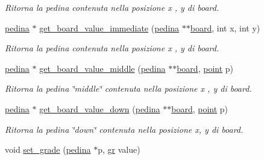 \begin{DoxyCompactItemize}
\begin{DoxyCompactList}\small\item\em Ritorna la {\itshape pedina} contenuta nella posizione {\itshape x} , {\itshape y} di {\itshape board}. \end{DoxyCompactList}\item 
\hyperlink{ml__lib_8h_a71fee95122b31f5cb0b07d9c16ffa3a5}{pedina} $\ast$ \hyperlink{group__Ausiliarie_ga7abcaeb9a9964698ffa11f5f86805909}{get\+\_\+board\+\_\+value\+\_\+immediate} (\hyperlink{ml__lib_8h_a71fee95122b31f5cb0b07d9c16ffa3a5}{pedina} $\ast$$\ast$\hyperlink{ml__main_8c_a62a3fe3d1df9ff58883b669f7f24e516}{board}, int x, int y)
\begin{DoxyCompactList}\small\item\em Ritorna la {\itshape pedina} contenuta nella posizione {\itshape x} , {\itshape y} di {\itshape board}. \end{DoxyCompactList}\item 
\hyperlink{ml__lib_8h_a71fee95122b31f5cb0b07d9c16ffa3a5}{pedina} $\ast$ \hyperlink{group__Ausiliarie_ga1e5f458cec21fb109ef5cff56b57f389}{get\+\_\+board\+\_\+value\+\_\+middle} (\hyperlink{ml__lib_8h_a71fee95122b31f5cb0b07d9c16ffa3a5}{pedina} $\ast$$\ast$\hyperlink{ml__main_8c_a62a3fe3d1df9ff58883b669f7f24e516}{board}, \hyperlink{structpunto}{point} p)
\begin{DoxyCompactList}\small\item\em Ritorna la {\itshape pedina} \char`\"{}middle\char`\"{} contenuta nella posizione {\itshape x} , {\itshape y} di {\itshape board}. \end{DoxyCompactList}\item 
\hyperlink{ml__lib_8h_a71fee95122b31f5cb0b07d9c16ffa3a5}{pedina} $\ast$ \hyperlink{group__Ausiliarie_gacde6d4e847576a401af96d1d84733533}{get\+\_\+board\+\_\+value\+\_\+down} (\hyperlink{ml__lib_8h_a71fee95122b31f5cb0b07d9c16ffa3a5}{pedina} $\ast$$\ast$\hyperlink{ml__main_8c_a62a3fe3d1df9ff58883b669f7f24e516}{board}, \hyperlink{structpunto}{point} p)
\begin{DoxyCompactList}\small\item\em Ritorna la {\itshape pedina} \char`\"{}down\char`\"{} contenuta nella posizione {\itshape x}, {\itshape y} di {\itshape board}. \end{DoxyCompactList}\item 
void \hyperlink{group__Ausiliarie_ga663d3a2fcf86042d03eb834766b7adea}{set\+\_\+grade} (\hyperlink{ml__lib_8h_a71fee95122b31f5cb0b07d9c16ffa3a5}{pedina} $\ast$p, \hyperlink{ml__lib_8h_a25f6e8adc446355e3f42092ecf9d598c}{gr} value)
$$
\end{DoxyCompactItemize}
